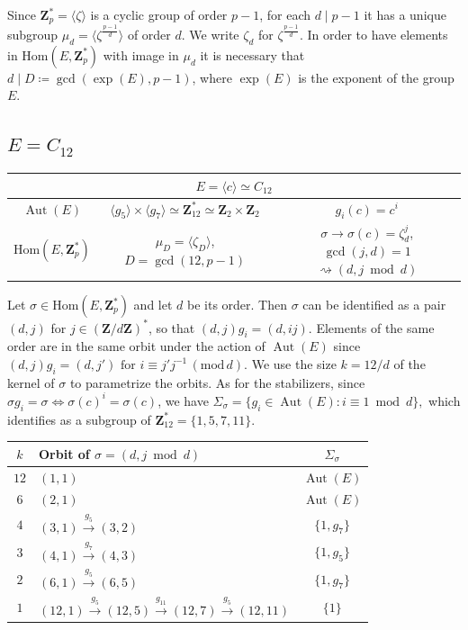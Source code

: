 \documentclass[12pt]{article}
\theoremstyle{definition}
\newcommand{\Z}{\mathbf Z}
\newcommand{\Hom}{\mathrm{Hom}}
\newcommand{\Aut}{\operatorname{Aut}}
\begin{document}
	Since $\Z_p^*=\langle \zeta \rangle $ is a cyclic group of order $p-1$,
	for each $d\mid p-1$ it has a unique subgroup $\mu_d=\langle \zeta^{\frac{p-1}d} \rangle$ of order $d$. We  write $\zeta_d$ for  $ \zeta^{\frac{p-1}d}$.
	In order to have elements in
	$\Hom(E ,\Z_p^*)$ with image in $\mu_d$ it is necessary that
	$d\mid D\coloneqq\gcd (\exp(E),p-1)$, where $\exp(E)$ is the exponent of the group $E$.
	
	\subsection{$E=C_{12}$}\label{ciclic}


\begin{center}
    \begin{tabular}{|c|c|c|}
\multicolumn{3}{c}{$E=\langle c\rangle\simeq C_{12}$}\\[1ex]
\hline
$\Aut(E)$&$\langle g_5\rangle\times \langle g_7\rangle\simeq\Z_{12}^*\simeq \Z_2\times \Z_2$ &
	 $g_i(c)=c^i$\\[1ex]
$\Hom(E,\Z_p^*)$ & 
$\mu_{D}=\langle \zeta_D\rangle$, $D=\gcd(12,p-1)$ &
$\sigma \to \sigma(c)=\zeta_d^j$, $\gcd(j,d)=1$ $\rightsquigarrow (d,j\bmod d)$\\
\hline
\end{tabular}
  \end{center}  
	
    Let $\sigma\in\Hom(E,\Z_p^*)$ and let $d$ be its order.
    Then $\sigma$ can be identified as a pair $(d, j)$ for $j\in(\Z/d\Z)^*$, so that $(d,j)g_i=(d,ij)$. 
    Elements of the same order are in the same orbit under the action of $\Aut(E)$ since
	$
	(d,j)g_i=(d,j') \mbox{ for } i\equiv j'j^{-1}\,(\mathrm{mod}\,d).
	$
	We use the size  $k=12/d$  of the kernel of $\sigma$ to parametrize the orbits. As for the stabilizers, since
	$\sigma g_i=\sigma\iff \sigma(c)^i=\sigma(c)$,
	we have
	$
	\Sigma_{\sigma}=\{g_i\in \Aut(E) : i\equiv 1 \bmod d\},
	$
	which identifies as a subgroup of $\Z_{12}^*=\{1,5,7,11\}$.
	\begin{center}
		\begin{tabular}{c|l | c}
			$k$  &Orbit of $\sigma=(d,j\bmod d)$& $\Sigma_{\sigma}$ \\
			\hline
			$12$&  $(1,1)$ & $\Aut(E)$\\
			$6$&  $(2,1)$ & $\Aut(E)$\\
			$4$&   $(3,1)\xrightarrow{g_5}(3,2)$& $\{1,g_7\}$\\
			$3$&  $(4,1)\xrightarrow{g_7}(4,3)$& $\{1,g_5\}$\\
			$2$&   $(6,1)\xrightarrow{g_5}(6,5)$& $\{1,g_7\}$\\
			$1$&   
			$(12,1)\xrightarrow{g_5}(12,5)\xrightarrow{g_{11}}(12,7)\xrightarrow{g_5}(12,11)$ & $\{1\}$\\
		\end{tabular}
	\end{center}
\end{document}
